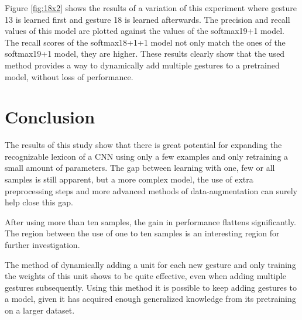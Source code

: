 \documentclass[twocolumn]{phdsymp} %
\begin{document}
Figure \ref{fig:18x2} shows the results of a variation of  this experiment where gesture 13 is learned first and gesture 18 is learned afterwards. The precision and recall values of this model are plotted against the values of the softmax19+1 model. The recall scores of the softmax18+1+1 model not only match the ones of the softmax19+1 model, they are higher. These results clearly show that the used method provides a way to dynamically add multiple gestures to a pretrained model, without loss of performance.


\section{Conclusion}
The results of this study show that there is great potential for expanding the recognizable lexicon of a CNN using only a few examples and only retraining a small amount of parameters. The gap between learning with one, few or all samples is still apparent, but a more complex model, the use of extra preprocessing steps and more advanced methods of data-augmentation can surely help close this gap.

After using more than ten samples, the gain in performance flattens significantly. The region between the use of one to ten samples is an interesting region for further investigation.

The method of dynamically adding a unit for each new gesture and only training the weights of this unit shows to be quite effective, even when adding multiple gestures subsequently. Using this method it is possible to keep adding gestures to a model, given it has acquired enough generalized knowledge from its pretraining on a larger dataset.




\nocite{*}

\end{document}
